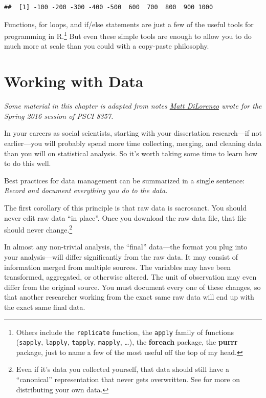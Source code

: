 \documentclass[
  12pt,
  oneside,openany]{book}
\begin{document}
\begin{verbatim}
##  [1] -100 -200 -300 -400 -500  600  700  800  900 1000
\end{verbatim}

Functions, for loops, and if/else statements are just a few of the useful tools for programming in R.\footnote{Others include the \texttt{replicate} function, the \texttt{apply} family of functions (\texttt{sapply}, \texttt{lapply}, \texttt{tapply}, \texttt{mapply}, \ldots), the \textbf{foreach} package, the \textbf{purrr} package, just to name a few of the most useful off the top of my head.} But even these simple tools are enough to allow you to do much more at scale than you could with a copy-paste philosophy.

\hypertarget{data}{%
\chapter{Working with Data}\label{data}}

\emph{Some material in this chapter is adapted from notes \href{http://mdilorenzo.github.io}{Matt DiLorenzo} wrote for the Spring 2016 session of PSCI 8357.}

In your careers as social scientists, starting with your dissertation research---if not earlier---you will probably spend more time collecting, merging, and cleaning data than you will on statistical analysis. So it's worth taking some time to learn how to do this well.

Best practices for data management can be summarized in a single sentence: \emph{Record and document everything you do to the data.}

The first corollary of this principle is that raw data is sacrosanct. You should never edit raw data ``in place''. Once you download the raw data file, that file should never change.\footnote{Even if it's data you collected yourself, that data should still have a ``canonical'' representation that never gets overwritten. See \citet{Leek:2015uw} for more on distributing your own data.}

In almost any non-trivial analysis, the ``final'' data---the format you plug into your analysis---will differ significantly from the raw data. It may consist of information merged from multiple sources. The variables may have been transformed, aggregated, or otherwise altered. The unit of observation may even differ from the original source. You must document every one of these changes, so that another researcher working from the exact same raw data will end up with the exact same final data.
\end{document}
